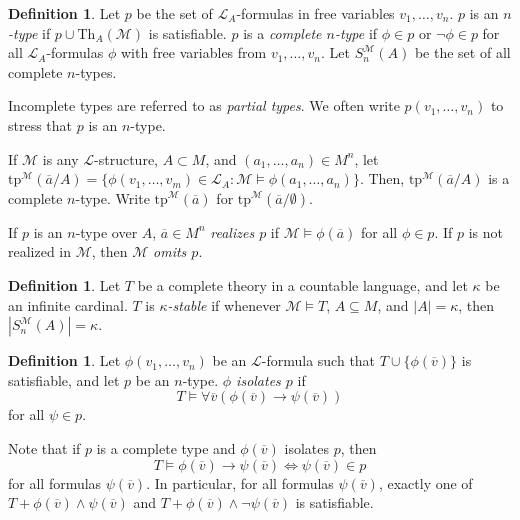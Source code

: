 \documentclass{amsart}
\theoremstyle{definition}
\newtheorem{definition}[theorem]{Definition}
\numberwithin{equation}{section}
\begin{document}
\begin{definition}
  Let $p$ be the set of $\mathcal{L}_A$-formulas in free variables $v_1,\dots,v_n$.
  $p$ is an \emph{$n$-type} if $p\cup \mathrm{Th}_A(\mathcal{M})$ is satisfiable.
  $p$ is a \emph{complete $n$-type} if $\phi\in p$ or $\neg\phi\in p$ for all $\mathcal{L}_A$-formulas $\phi$ with free variables from $v_1,\dots,v_n$.
  Let $S^{\mathcal{M}}_n(A)$ be the set of all complete $n$-types.

  Incomplete types are referred to as \emph{partial types}.
  We often write $p(v_1,\dots,v_n)$ to stress that $p$ is an $n$-type.

  If $\mathcal{M}$ is any $\mathcal{L}$-structure,
  $A \subset M$, and $(a_1,\dots,a_n)\in M^n$,
  let $\mathrm{tp}^{\mathcal{M}}(\overline{a}/A) = \{\phi(v_1,\dots,v_m)\in \mathcal{L}_A:\mathcal{M}\models \phi(a_1,\dots,a_n)\}$.
  Then, $\mathrm{tp}^{\mathcal{M}}(\overline{a}/A)$ is a complete $n$-type.
  Write $\mathrm{tp}^{\mathcal{M}}(\overline{a})$ for $\mathrm{tp}^{\mathcal{M}}(\overline{a}/\emptyset)$.

  If $p$ is an $n$-type over $A$,
  $\overline{a}\in M^n$ \emph{realizes $p$} if $\mathcal{M} \models \phi(\overline{a})$ for all $\phi\in p$.
  If $p$ is not realized in $\mathcal{M}$,
  then $\mathcal{M}$ \emph{omits $p$}.
\end{definition}

\begin{definition}
  Let $T$ be a complete theory in a countable language,
  and let $\kappa$ be an infinite cardinal.
  $T$ is \emph{$\kappa$-stable} if whenever $\mathcal{M}\models T$,
  $A \subseteq M$, and $|A| = \kappa$, then $|S^{\mathcal{M}}_n(A)| = \kappa$.
\end{definition}

\begin{definition}
  Let $\phi(v_1,\dots,v_n)$ be an $\mathcal{L}$-formula such that $T \cup \{\phi(\overline{v})\}$ is satisfiable,
  and let $p$ be an $n$-type.
  \emph{$\phi$ isolates $p$} if
  \[
    T \models \forall\overline{v}(\phi(\overline{v}) \to \psi(\overline{v}))
  \]
  for all $\psi \in p$.
\end{definition}
Note that if $p$ is a complete type and $\phi(\overline{v})$ isolates $p$, then
\[
  T \models \phi(\overline{v}) \to \psi(\overline{{v}}) \iff \psi(\overline{v})\in p
\]
for all formulas $\psi(\overline{v})$.
In particular, for all formulas $\psi(\overline{v})$,
exactly one of $T + \phi(\overline{v}) \land \psi(\overline{v})$ and $T + \phi(\overline{v}) \land \neg\psi(\overline{v})$ is satisfiable.
\end{document}
